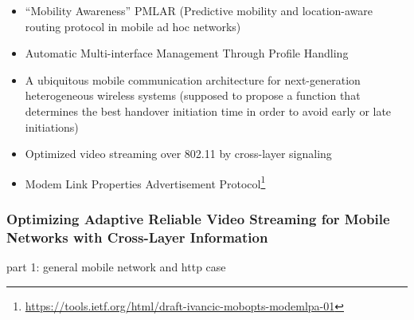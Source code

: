 \begin{itemize}
	\item ``Mobility Awareness'' \cite{hummel2010mobilitaet} PMLAR (Predictive mobility and location-aware routing protocol in mobile ad hoc networks)
	\item Automatic Multi-interface Management Through Profile Handling \cite{Bonnin:2009:AMM:1503496.1503498}
	\item A ubiquitous mobile communication architecture for next-generation heterogeneous wireless systems \cite{1452832} (supposed to propose a function that determines the best handover initiation time in order to avoid early or late initiations)
	\item Optimized video streaming over 802.11 by cross-layer signaling \cite{1580941}

 	\item Modem Link Properties Advertisement Protocol\footnote{\url{https://tools.ietf.org/html/draft-ivancic-mobopts-modemlpa-01}}

\end{itemize}




\subsubsection{Optimizing Adaptive Reliable Video Streaming for Mobile Networks with Cross-Layer Information}

part 1: general mobile network and http case

